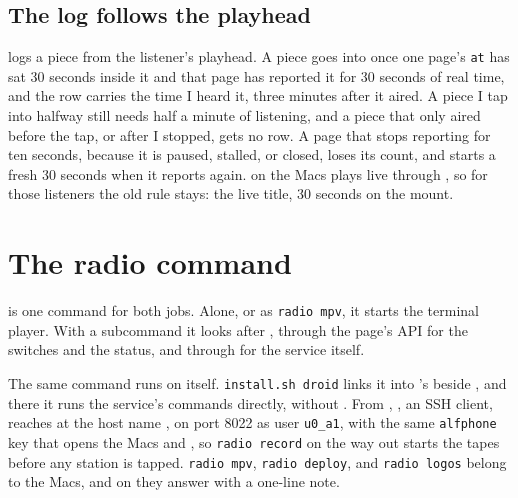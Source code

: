 \documentclass[11pt,a4paper]{article}
\begin{document}
\subsection*{The log follows the playhead}

 logs a piece from the listener's playhead. A piece goes into  once one page's \texttt{at} has sat 30 seconds inside it and that page has reported it for 30 seconds of real time, and the row carries the time I heard it, three minutes after it aired. A piece I tap into halfway still needs half a minute of listening, and a piece that only aired before the tap, or after I stopped, gets no row. A page that stops reporting for ten seconds, because it is paused, stalled, or closed, loses its count, and starts a fresh 30 seconds when it reports again.  on the Macs plays live through , so for those listeners the old rule stays: the live title, 30 seconds on the mount.

\section*{The radio command}

 is one command for both jobs. Alone, or as \texttt{radio mpv}, it starts the terminal player. With a subcommand it looks after , through the page's API for the switches and the status, and through  for the service itself.

The same command runs on  itself. \texttt{install.sh droid} links it into 's  beside , and there it runs the service's commands directly, without . From , , an SSH client, reaches  at the host name , on port 8022 as user \texttt{u0\_a1}, with the same \texttt{alfphone} key that opens the Macs and , so \texttt{radio record} on the way out starts the tapes before any station is tapped. \texttt{radio mpv}, \texttt{radio deploy}, and \texttt{radio logos} belong to the Macs, and on  they answer with a one-line note.
\end{document}
